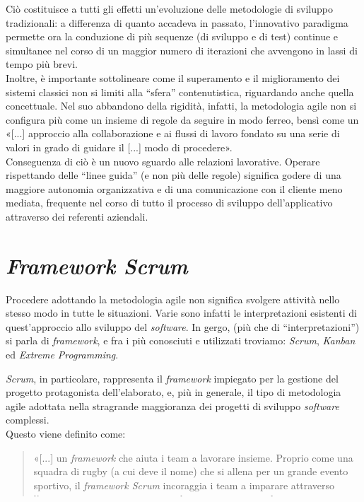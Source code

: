 Ciò costituisce a tutti gli effetti un'evoluzione delle metodologie di sviluppo tradizionali: a differenza di quanto accadeva in passato, l'innovativo paradigma permette ora la conduzione di più sequenze (di sviluppo e di test) continue e simultanee nel corso di un maggior numero di iterazioni che avvengono in lassi di tempo più brevi.\\
Inoltre, è importante sottolineare come il superamento e il miglioramento dei sistemi classici non si limiti
alla “sfera” contenutistica, riguardando anche quella concettuale. Nel suo abbandono della rigidità, infatti, la metodologia agile non si configura più come un insieme di regole da seguire in modo ferreo, bensì come un «[...] approccio alla collaborazione e ai flussi di lavoro fondato su una serie di valori in grado di guidare il [...] modo di procedere»\cite{RedHat_MetodologiaAgile}.\\
Conseguenza di ciò è un nuovo sguardo alle relazioni lavorative. Operare rispettando delle “linee guida” (e non più delle regole) significa godere di una maggiore autonomia organizzativa e di una comunicazione con il cliente meno mediata, frequente nel corso di tutto il processo di sviluppo dell'applicativo attraverso dei referenti aziendali.

\section{\textit{Framework Scrum}}
Procedere adottando la metodologia agile non significa svolgere attività nello stesso modo in tutte le situazioni. Varie sono infatti le interpretazioni esistenti di quest'approccio allo sviluppo del \textit{software}. In gergo, (più che di “interpretazioni”) si parla di \textit{framework}, e fra i più conosciuti e utilizzati troviamo: \textit{Scrum}, \textit{Kanban} ed \textit{Extreme Programming}.

\textit{Scrum}, in particolare, rappresenta il \textit{framework} impiegato per la gestione del progetto protagonista dell'elaborato, e, più in generale, il tipo di metodologia agile adottata nella stragrande maggioranza dei progetti di sviluppo \textit{software} complessi.\\
Questo viene definito come:
\begin{quote}
  «[...] un \textit{framework} che aiuta i team a lavorare insieme. Proprio come una squadra di rugby (a cui deve il nome) che si allena per un grande evento sportivo, il \textit{framework Scrum} incoraggia i team a imparare attraverso l'esperienza, a organizzarsi in modo autonomo mentre lavorano su un problema e a riflettere sui risultati conseguiti e sugli insuccessi per migliorare continuamente»\cite{Atalassian_FrameworkScrum}.
\end{quote}

